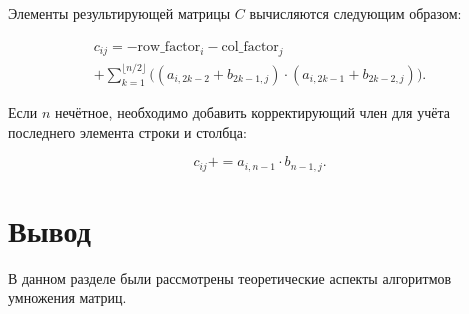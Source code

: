 Элементы результирующей матрицы \( C \) вычисляются следующим образом:

\begin{equation}
    \begin{split}
        c_{ij} = -\text{row\_factor}_i - \text{col\_factor}_j \\
        + \sum_{k=1}^{\lfloor n/2 \rfloor} \Big( (a_{i, 2k - 2} + b_{2k - 1, j})
        \cdot (a_{i, 2k - 1} + b_{2k - 2, j}) \Big).
    \end{split}
\end{equation}

Если \( n \) нечётное, необходимо добавить корректирующий член для учёта последнего элемента строки и столбца:

\begin{equation}
    c_{ij} += a_{i, n-1} \cdot b_{n-1, j}.
\end{equation}

\section*{Вывод}

В данном разделе были рассмотрены теоретические аспекты алгоритмов умножения матриц.

